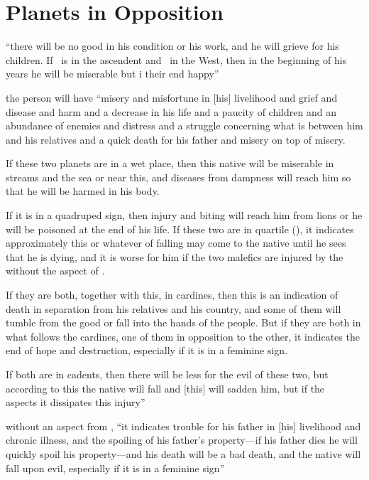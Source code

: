 \section{Planets in Opposition}
\begin{description}[style=multiline,leftmargin=1.5cm]
\item[\Saturn\Opposition\Jupiter]
``there will be no good in his condition or his work, and he will grieve for his children. If \Saturn\, is in the ascendent and \Jupiter\, in the West, then in the beginning of his years he will be miserable but i their end happy''

\item[\Saturn\Opposition\Mars] 
the person will have ``misery and misfortune in [his] livelihood and grief and disease and harm and a decrease in his life and a paucity of children and an abundance of enemies and distress and a struggle concerning what is between him and his relatives and a quick death for his father and misery on top of misery. 

If these two planets are in a wet place, then this native will be miserable in streams and the sea or near this, and diseases from dampness will reach him so that he will be harmed in his body. 

If it is in a quadruped sign, then injury and biting will reach him from lions or he will be poisoned at the end of his life. If these two are in quartile (\Square), it indicates approximately this or whatever of falling may come to the native until he sees that he is dying, and it is worse for him if the two malefics are injured by the \Moon\, without the aspect of \Jupiter. 

If they are both, together with this, in cardines, then this is an indication of death in separation from his relatives and his country, and some of them will tumble from the good or fall into the hands of the people. But if they are both in what follows the cardines, one of them in opposition to the other, it indicates the end of hope and destruction, especially if it is in a feminine sign.

If both are in cadents, then there will be less for the evil of these two, but according to this the native will fall and [this] will sadden him, but if the \Sun\, aspects it dissipates this injury''

\item[\Saturn\Opposition\Sun] without an aspect from \Jupiter, ``it indicates trouble for his father in [his] livelihood and chronic illness, and the spoiling of his father's property---if his father dies he will quickly spoil his property---and his death will be a bad death, and the native will fall upon evil, especially if it is in a feminine sign''


\end{description}

